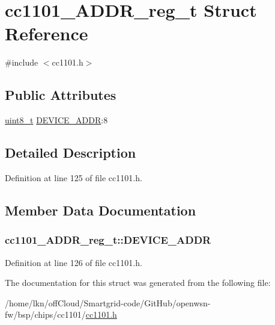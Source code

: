 \hypertarget{structcc1101___a_d_d_r__reg__t}{}\section{cc1101\+\_\+\+A\+D\+D\+R\+\_\+reg\+\_\+t Struct Reference}
\label{structcc1101___a_d_d_r__reg__t}


{\ttfamily \#include $<$cc1101.\+h$>$}

\subsection*{Public Attributes}
\begin{DoxyCompactItemize}
\item 
\hyperlink{_p_e___types_8h_aba7bc1797add20fe3efdf37ced1182c5}{uint8\+\_\+t} \hyperlink{structcc1101___a_d_d_r__reg__t_a5cf166c0f82b69904c890b0d33164c32}{D\+E\+V\+I\+C\+E\+\_\+\+A\+D\+DR}\+:8
\end{DoxyCompactItemize}


\subsection{Detailed Description}


Definition at line 125 of file cc1101.\+h.



\subsection{Member Data Documentation}
\subsubsection[{\texorpdfstring{D\+E\+V\+I\+C\+E\+\_\+\+A\+D\+DR}{DEVICE_ADDR}}]{ cc1101\+\_\+\+A\+D\+D\+R\+\_\+reg\+\_\+t\+::\+D\+E\+V\+I\+C\+E\+\_\+\+A\+D\+DR}\hypertarget{structcc1101___a_d_d_r__reg__t_a5cf166c0f82b69904c890b0d33164c32}{}\label{structcc1101___a_d_d_r__reg__t_a5cf166c0f82b69904c890b0d33164c32}


Definition at line 126 of file cc1101.\+h.



The documentation for this struct was generated from the following file\+:\begin{DoxyCompactItemize}
\item 
/home/lkn/off\+Cloud/\+Smartgrid-\/code/\+Git\+Hub/openwsn-\/fw/bsp/chips/cc1101/\hyperlink{cc1101_8h}{cc1101.\+h}\end{DoxyCompactItemize}
